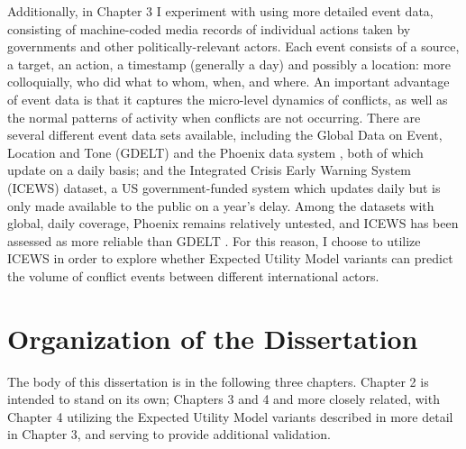 Additionally, in Chapter 3 I experiment with using more detailed event data, consisting of machine-coded media records of individual actions taken by governments and other politically-relevant actors. Each event consists of a source, a target, an action, a timestamp (generally a day) and possibly a location: more colloquially, who did what to whom, when, and where. An important advantage of event data is that it captures the micro-level dynamics of conflicts, as well as the normal patterns of activity when conflicts are not occurring. There are several different event data sets available, including the Global Data on Event, Location and Tone (GDELT) \citep{leetaru_2013} and the Phoenix data system \citep{schrodt_2014}, both of which update on a daily basis; and the Integrated Crisis Early Warning System (ICEWS) \citep{boschee_2015} dataset, a US government-funded system which updates daily but is only made available to the public on a year's delay. Among the datasets with global, daily coverage, Phoenix remains relatively untested, and ICEWS has been assessed as more reliable than GDELT \citep{ward_2013}. For this reason, I choose to utilize ICEWS in order to explore whether Expected Utility Model variants can predict the volume of conflict events between different international actors. 

\section{Organization of the Dissertation}

The body of this dissertation is in the following three chapters. Chapter 2 is intended to stand on its own; Chapters 3 and 4 and more closely related, with Chapter 4 utilizing the Expected Utility Model variants described in more detail in Chapter 3, and serving to provide additional validation.

